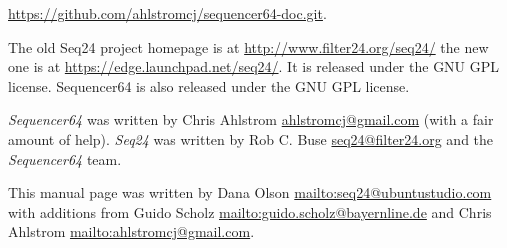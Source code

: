    \url{https://github.com/ahlstromcj/sequencer64-doc.git}.

   The old Seq24 project homepage is at
   \url{http://www.filter24.org/seq24/} the new
   one is at \url{https://edge.launchpad.net/seq24/}.
   It is released under the GNU GPL license.
   Sequencer64 is also released under the GNU GPL license.

   \textsl{Sequencer64} was written by Chris Ahlstrom
   \href{mailto:ahlstromcj@gmail.com}{ahlstromcj@gmail.com}
   (with a fair amount of help).
   \textsl{Seq24} was written by Rob C. Buse
   \href{mailto:seq24@filter24.org}{seq24@filter24.org}
   and the \textsl{Sequencer64} team.

   This manual page was written by Dana Olson
   \url{mailto:seq24@ubuntustudio.com} with additions from Guido Scholz
   \url{mailto:guido.scholz@bayernline.de} and Chris Ahlstrom
   \url{mailto:ahlstromcj@gmail.com}.


